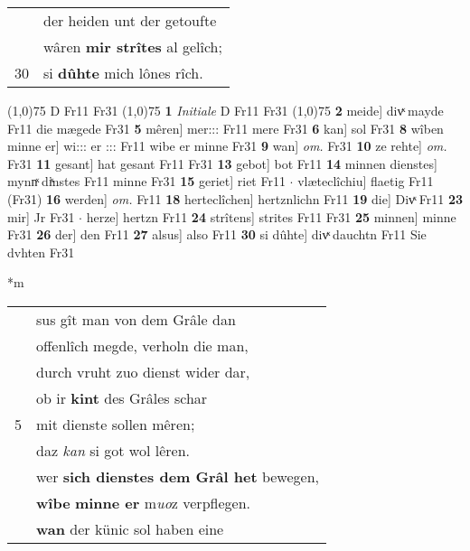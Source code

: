 \documentclass[8pt,a4paper,notitlepage]{article}
\begin{document}
\begin{table}[ht]
\begin{minipage}[t]{0.5\linewidth}
\begin{tabular}{rl}
 & der heiden unt der getoufte\\ 
 & wâren \textbf{mir strîtes} al gelîch;\\ 
30 & si \textbf{dûhte} mich lônes rîch.\\ 
\end{tabular}
\scriptsize
\line(1,0){75} \newline
D Fr11 Fr31 \newline
\line(1,0){75} \newline
\textbf{1} \textit{Initiale} D Fr11 Fr31  \newline
\line(1,0){75} \newline
\textbf{2} meide] divͯ mayde Fr11 die mægede Fr31 \textbf{5} mêren] mer::: Fr11 mere Fr31 \textbf{6} kan] sol Fr31 \textbf{8} wîben minne er] wi::: er ::: Fr11 wibe er minne Fr31 \textbf{9} wan] \textit{om.} Fr31 \textbf{10} ze rehte] \textit{om.} Fr31 \textbf{11} gesant] hat gesant Fr11 Fr31 \textbf{13} gebot] bot Fr11 \textbf{14} minnen dienstes] mynnͯ diͯnstes Fr11 minne Fr31 \textbf{15} geriet] riet Fr11  $\cdot$ vlæteclîchiu] flaetig Fr11 (Fr31) \textbf{16} werden] \textit{om.} Fr11 \textbf{18} herteclîchen] hertznlichn Fr11 \textbf{19} die] Divͯ Fr11 \textbf{23} mir] Jr Fr31  $\cdot$ herze] hertzn Fr11 \textbf{24} strîtens] strites Fr11 Fr31 \textbf{25} minnen] minne Fr31 \textbf{26} der] den Fr11 \textbf{27} alsus] also Fr11 \textbf{30} si dûhte] divͯ dauchtn Fr11 Sie dvhten Fr31 \newline
\end{minipage}
\hspace{0.5cm}
\begin{minipage}[t]{0.5\linewidth}
\small
\begin{center}*m
\end{center}
\begin{tabular}{rl}
 & sus gît man von dem Grâle dan\\ 
 & offenlîch megde, verholn die man,\\ 
 & durch vruht zuo dienst wider dar,\\ 
 & ob ir \textbf{kint} des Grâles schar\\ 
5 & mit dienste sollen mêren;\\ 
 & daz \textit{kan} si got wol lêren.\\ 
 & wer \textbf{sich dienstes dem Grâl het} bewegen,\\ 
 & \textbf{wîbe} \textbf{minne er} m\textit{uo}z verpflegen.\\ 
 & \textbf{wan} der künic sol haben eine\\ 

\end{tabular}
\end{minipage}
\end{table}
\end{document}
